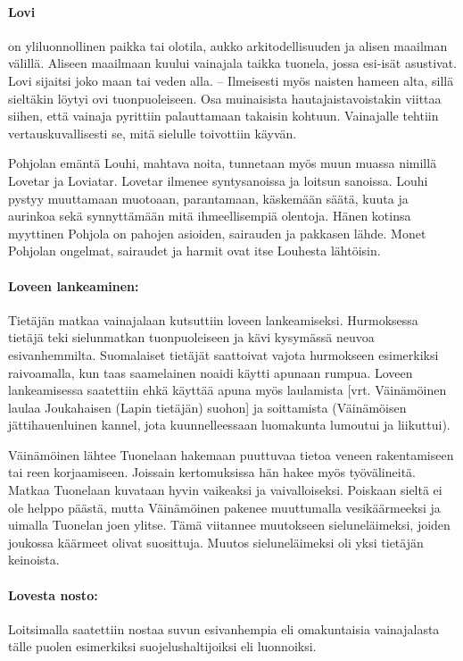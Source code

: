   \paragraph{Lovi} on yliluonnollinen paikka tai olotila, aukko arkitodellisuuden ja alisen maailman 
    välillä. Aliseen maailmaan kuului vainajala taikka tuonela, jossa esi-isät asustivat. Lovi 
    sijaitsi joko maan tai veden alla. -- Ilmeisesti myös naisten hameen alta, sillä sieltäkin 
    löytyi ovi tuonpuoleiseen. Osa muinaisista hautajaistavoistakin viittaa siihen, että vainaja 
    pyrittiin palauttamaan takaisin kohtuun. Vainajalle tehtiin vertauskuvallisesti se, mitä 
    sielulle toivottiin käyvän. \par Pohjolan emäntä Louhi, mahtava noita, tunnetaan myös muun muassa 
    nimillä Lovetar ja Loviatar. Lovetar ilmenee syntysanoissa ja loitsun sanoissa. Louhi pystyy 
    muuttamaan muotoaan, parantamaan, käskemään säätä, kuuta ja aurinkoa sekä synnyttämään mitä 
    ihmeellisempiä olentoja. Hänen kotinsa myyttinen Pohjola on pahojen asioiden, sairauden ja 
    pakkasen lähde. Monet Pohjolan ongelmat, sairaudet ja harmit ovat itse Louhesta lähtöisin.
  \paragraph{Loveen lankeaminen:} Tietäjän matkaa vainajalaan kutsuttiin loveen lankeamiseksi. 
    Hurmoksessa tietäjä teki sielunmatkan tuonpuoleiseen ja kävi kysymässä neuvoa esivanhemmilta.  
    Suomalaiset tietäjät saattoivat vajota hurmokseen esimerkiksi raivoamalla, kun taas 
    saamelainen noaidi käytti apunaan rumpua. Loveen lankeamisessa saatettiin ehkä käyttää apuna 
    myös laulamista [vrt. Väinämöinen laulaa Joukahaisen (Lapin tietäjän) suohon] ja 
    soittamista (Väinämöisen jättihauenluinen kannel, jota kuunnelleessaan luomakunta lumoutui 
    ja liikuttui). \par Väinämöinen lähtee Tuonelaan hakemaan puuttuvaa tietoa veneen rakentamiseen 
    tai reen korjaamiseen. Joissain kertomuksissa hän hakee myös työvälineitä. Matkaa Tuonelaan 
    kuvataan hyvin vaikeaksi ja vaivalloiseksi. Poiskaan sieltä ei ole helppo päästä, mutta 
    Väinämöinen pakenee muuttumalla vesikäärmeeksi ja uimalla Tuonelan joen ylitse. Tämä 
    viitannee muutokseen sieluneläimeksi, joiden joukossa käärmeet olivat suosittuja. Muutos 
    sieluneläimeksi oli yksi tietäjän keinoista.
  \paragraph{Lovesta nosto:} Loitsimalla saatettiin nostaa suvun esivanhempia eli omakuntaisia 
    vainajalasta tälle puolen esimerkiksi suojelushaltijoiksi eli luonnoiksi.
